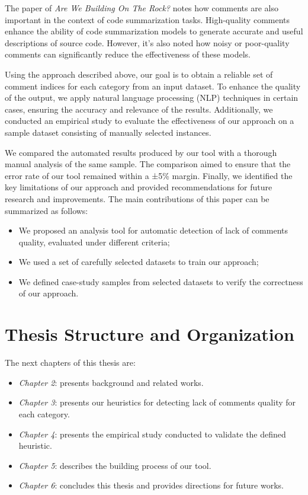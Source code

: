 \noindent The paper of \textit{Are We Building On The Rock?} \cite{buildingRock} notes how comments are also important in the context of code summarization tasks.
High-quality comments enhance the ability of code summarization models to generate accurate and useful descriptions of source code. However, it's also noted how noisy or poor-quality comments can significantly reduce the effectiveness of these models.

\noindent Using the approach described above, our goal is to obtain a reliable set of comment indices for each category from an input dataset. To enhance the quality of the output, we apply natural language processing (NLP) techniques in certain cases, ensuring the accuracy and relevance of the results. Additionally, we conducted an empirical study to evaluate the effectiveness of our approach on a sample dataset consisting of manually selected instances.

\noindent We compared the automated results produced by our tool with a thorough manual analysis of the same sample. The comparison aimed to ensure that the error rate of our tool remained within a ±5\% margin. Finally, we identified the key limitations of our approach and provided recommendations for future research and improvements. The main contributions of this paper can be summarized as follows:
\begin{itemize}
    \item We proposed an analysis tool for automatic detection of lack of comments quality, evaluated under different criteria;
    \item We used a set of carefully selected datasets to train our approach;
    \item We defined case-study samples from selected datasets to verify the correctness of our approach.
\end{itemize}

\section{Thesis Structure and Organization}
The next chapters of this thesis are:

\begin{itemize}
\item \textit{Chapter 2}: presents background and related works.
\item \textit{Chapter 3}: presents our heuristics for detecting lack of comments quality for each category.
\item \textit{Chapter 4}: presents the empirical study conducted to validate the
defined heuristic.
\item \textit{Chapter 5}: describes the building process of our tool.
\item \textit{Chapter 6}: concludes this thesis and provides directions for future
works.

\end{itemize}